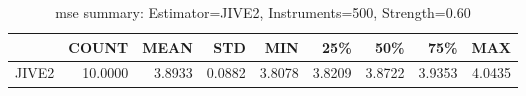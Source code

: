 \begin{table}[ht]
\centering
\caption{mse summary: Estimator=JIVE2, Instruments=500, Strength=0.60}
\begin{tabular}{lrrrrrrrr}
\toprule
 & COUNT & MEAN & STD & MIN & 25\% & 50\% & 75\% & MAX \\
\midrule
JIVE2 & 10.0000 & 3.8933 & 0.0882 & 3.8078 & 3.8209 & 3.8722 & 3.9353 & 4.0435 \\
\bottomrule
\end{tabular}
\end{table}
